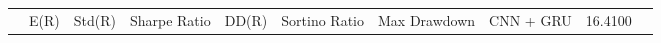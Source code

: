 \begin{tabular}{lrrrrrrrrr}
 & E(R) & Std(R) & Sharpe Ratio & DD(R) & Sortino Ratio & Max Drawdown & %
CNN + GRU & 16.4100%
\end{tabular}

